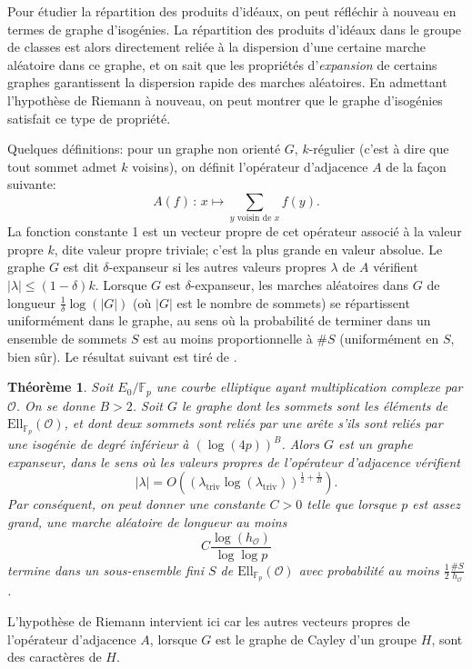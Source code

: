 \documentclass[11pt,a4paper]{article}
\newcommand{\F}{\mathbb{F}}
\renewcommand{\O}{\mathcal{O}}
\newcommand{\Ell}{\mathrm{Ell}}
\newcommand{\de}{\,:\,}
\renewcommand{\v}{\vspace{5mm}}
\newtheorem*{thm}{Théorème}
\theoremstyle{definition}
\begin{document}
\v
Pour étudier la répartition des produits d'idéaux, on peut réfléchir à nouveau en termes de graphe d'isogénies. La répartition des produits d'idéaux dans le groupe de classes est alors directement reliée à la dispersion d'une certaine marche aléatoire dans ce graphe, et on sait que les propriétés d'\emph{expansion} de certains graphes garantissent la dispersion rapide des marches aléatoires. En admettant l'hypothèse de Riemann à nouveau, on peut montrer que le graphe d'isogénies satisfait ce type de propriété. 

Quelques définitions: pour un graphe non orienté $G$, $k$-régulier (c'est à dire que tout sommet admet $k$ voisins), on définit l'opérateur d'adjacence $A$ de la façon suivante:
$$A(f)\de x\longmapsto \sum_{y \text{ voisin de } x} f(y).$$
La fonction constante 1 est un vecteur propre de cet opérateur associé à la valeur propre $k$, dite valeur propre triviale; c'est la plus grande en valeur absolue. Le graphe $G$ est dit $\delta$-expanseur si les autres valeurs propres $\lambda$ de $A$ vérifient $|\lambda|\leq (1-\delta) k$. Lorsque $G$ est $\delta$-expanseur, les marches aléatoires dans $G$ de longueur $\frac{1}{\delta} \log(|G|)$ (où $|G|$ est le nombre de sommets) se répartissent uniformément dans le graphe, au sens où la probabilité de terminer dans un ensemble de sommets $S$ est au moins proportionnelle à $\#S$ (uniformément en $S$, bien sûr). Le résultat suivant est tiré de \cite{GRH}.

\begin{thm}
Soit $E_0/\F_p$ une courbe elliptique ayant multiplication complexe par $\O$. On se donne $B>2$. Soit $G$ le graphe dont les sommets sont les éléments de $\Ell_{\F_p}(\O)$, et dont deux sommets sont reliés par une arête s'ils sont reliés par une isogénie de degré inférieur à $(\log(4p))^B$. Alors $G$ est un graphe expanseur, dans le sens où les valeurs propres de l'opérateur d'adjacence vérifient
$$|\lambda| = O\left((\lambda_{\text{triv}} \log(\lambda_{\text{triv}}))^{\frac{1}{2} + \frac{1}{B}}\right).$$
Par conséquent, on peut donner une constante $C>0$ telle que lorsque $p$ est assez grand, une marche aléatoire de longueur au moins
$$C \frac{\log(h_\O)}{\log\log p}$$
termine dans un sous-ensemble fini $S$ de $\Ell_{\F_p}(\O)$ avec probabilité au moins $\frac{1}{2} \frac{\#S}{h_\O}$.
\end{thm}

L'hypothèse de Riemann intervient ici car les autres vecteurs propres de l'opérateur d'adjacence $A$, lorsque $G$ est le graphe de Cayley d'un groupe $H$, sont des caractères de $H$.
\end{document}
